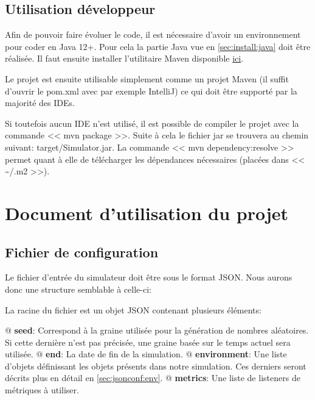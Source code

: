\documentclass[final]{polytech/polytech}
\begin{document}
	\section{Utilisation développeur}
		Afin de pouvoir faire évoluer le code, il est nécessaire d'avoir un environnement pour coder en Java 12+.
		Pour cela la partie Java vue en \autoref{sec:install:java} doit être réalisée.
		Il faut ensuite installer l'utilitaire Maven disponible \href{https://maven.apache.org/download.cgi}{ici}.
		
		Le projet est ensuite utilisable simplement comme un projet Maven (il suffit d'ouvrir le pom.xml avec par exemple IntelliJ) ce qui doit être supporté par la majorité des IDEs.
		
		Si toutefois aucun IDE n'est utilisé, il est possible de compiler le projet avec la commande << mvn package >>.
		Suite à cela le fichier jar se trouvera au chemin suivant: target/Simulator.jar.
		La commande << mvn dependency:resolve >> permet quant à elle de télécharger les dépendances nécessaires (placées dans << \textasciitilde/.m2 >>).
 

\chapter{Document d'utilisation du projet}
	\section{Fichier de configuration\label{sec:jsoninput}}
		Le fichier d'entrée du simulateur doit être sous le format JSON.
		Nous aurons donc une structure semblable à celle-ci:
		
		La racine du fichier est un objet JSON contenant plusieurs éléments:
		\begin{easylist}[itemize]
			@ \textbf{seed}: Correspond à la graine utilisée pour la génération de nombres aléatoires. Si cette dernière n'est pas précisée, une graine basée sur le temps actuel sera utilisée.
			@ \textbf{end}: La date de fin de la simulation. 
			@ \textbf{environment}: Une liste d'objets définissant les objets présents dans notre simulation. Ces derniers seront décrits plus en détail en \autoref{sec:jsonconf:env}.
			@ \textbf{metrics}: Une liste de listeners de métriques à utiliser.	
		\end{easylist}
		
\end{document}
